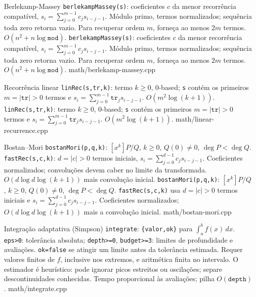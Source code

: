 \fi

\templateentry
{Berlekamp-Massey}
{\texttt{berlekampMassey(s)}: coeficientes $c$ da menor recorrência compatível, $s_i=\sum_{j=0}^{m-1}c_j s_{i-j-1}$. Módulo primo, termos normalizados; sequência toda zero retorna vazio. Para recuperar ordem $m$, forneça ao menos $2m$ termos. $O(n^2+n\log \mathtt{mod})$.}
{\texttt{berlekampMassey(s)}: coeficientes $c$ da menor recorrência compatível, $s_i=\sum_{j=0}^{m-1}c_j s_{i-j-1}$. Módulo primo, termos normalizados; sequência toda zero retorna vazio. Para recuperar ordem $m$, forneça ao menos $2m$ termos. $O(n^2+n\log \mathtt{mod})$.}
{math/berlekamp-massey.cpp}

\templateentry
{Recorrência linear}
{\texttt{linRec(s,tr,k)}: termo $k\ge0$, 0-based; \texttt{s} contém os primeiros $m=|\mathtt{tr}|>0$ termos e $s_i=\sum_{j=0}^{m-1}\mathtt{tr}_j s_{i-j-1}$. $O(m^2\log(k+1))$.}
{\texttt{linRec(s,tr,k)}: termo $k\ge0$, 0-based; \texttt{s} contém os primeiros $m=|\mathtt{tr}|>0$ termos e $s_i=\sum_{j=0}^{m-1}\mathtt{tr}_j s_{i-j-1}$. $O(m^2\log(k+1))$.}
{math/linear-recurrence.cpp}

\templateentry
{Bostan--Mori}
{\texttt{bostanMori(p,q,k)}: $[x^k]P/Q$, $k\ge0$, $Q(0)\ne0$, $\deg P<\deg Q$. \texttt{fastRec(s,c,k)}: $d=|c|>0$ termos iniciais, $s_i=\sum_{j=0}^{d-1}c_js_{i-j-1}$. Coeficientes normalizados; convoluções devem caber no limite da transformada. $O(d\log d\log(k+1))$ mais convolução inicial.}
{\texttt{bostanMori(p,q,k)}: $[x^k]P/Q$, $k\ge0$, $Q(0)\ne0$, $\deg P<\deg Q$. \texttt{fastRec(s,c,k)} usa $d=|c|>0$ termos iniciais e $s_i=\sum_{j=0}^{d-1}c_j s_{i-j-1}$. Coeficientes normalizados; $O(d\log d\log(k+1))$ mais a convolução inicial.}
{math/bostan-mori.cpp}

\ifextended

\templateentry
{Integração adaptativa (Simpson)}
{}
{\texttt{integrate}: \texttt{\{valor,ok\}} para $\int_a^b f(x)\,dx$. \texttt{eps>0}: tolerância absoluta; \texttt{depth>=0}, \texttt{budget>=3}: limites de profundidade e avaliações. \texttt{ok=false} se atingir um limite antes da tolerância estimada. Requer valores finitos de $f$, inclusive nos extremos, e aritmética finita no intervalo. O estimador é heurístico: pode ignorar picos estreitos ou oscilações; separe descontinuidades conhecidas. Tempo proporcional às avaliações; pilha $O(\texttt{depth})$.}
{math/integrate.cpp}

\fi
